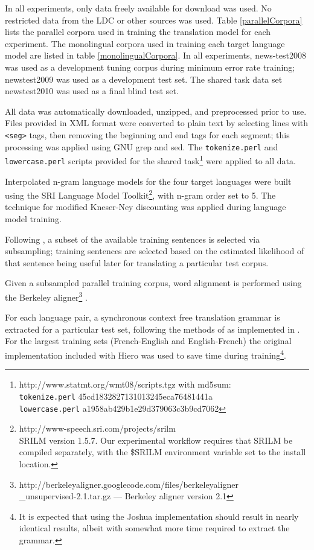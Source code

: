 \documentclass[11pt]{article}
\begin{document}
In all experiments, only data freely available for download was used. No restricted data from the LDC or other sources was used. Table \ref{parallelCorpora} lists the parallel corpora used in training the translation model for each experiment. The monolingual corpora used in training each target language model are listed in table \ref{monolingualCorpora}. In all experiments, news-test2008 was used as a development tuning corpus during minimum error rate training; newstest2009 was used as a development test set. The shared task data set newstest2010 was used as a final blind test set.

All data was automatically downloaded, unzipped, and preprocessed prior to use. Files provided in XML format were converted to plain text by selecting lines with {\tt <seg>} tags, then removing the beginning and end tags for each segment; this processing was applied using GNU grep and sed. The {\tt tokenize.perl} and {\tt lowercase.perl} scripts provided for the shared task\footnote{http://www.statmt.org/wmt08/scripts.tgz with md5sum: \\ {\tt tokenize.perl} 45cd1832827131013245eca76481441a \\ {\tt lowercase.perl} a1958ab429b1e29d379063c3b9cd7062} were applied to all data.

Interpolated n-gram language models for the four target languages were built using the SRI Language Model Toolkit\footnote{ http://www-speech.sri.com/projects/srilm \\ SRILM version 1.5.7. Our experimental workflow requires that SRILM be compiled separately, with the \$SRILM environment variable set to the install location.}, with n-gram order set to 5. The  technique for modified Kneser-Ney discounting \cite{Kneser1995} was applied during language model training.

Following , a subset of the available training sentences is selected via subsampling; training sentences are selected based on the estimated likelihood of that sentence being useful later for translating a particular test corpus. 


Given a subsampled parallel training corpus, word alignment is performed using the Berkeley aligner\footnote{http://berkeleyaligner.googlecode.com/files/berkeleyaligner\\\_unsupervised-2.1.tar.gz --- Berkeley aligner version 2.1} \cite{liang06alignment}. 

For each language pair, a synchronous context free translation grammar is extracted for a particular test set, following the methods of  as implemented in \cite{Schwartz-PBML}. For the largest training sets (French-English and English-French) the original \cite{Lopez2008} implementation included with Hiero was used to save time during training\footnote{It is expected that using the Joshua implementation should result in nearly identical results, albeit with somewhat more time required to extract the grammar.}.
\end{document}
